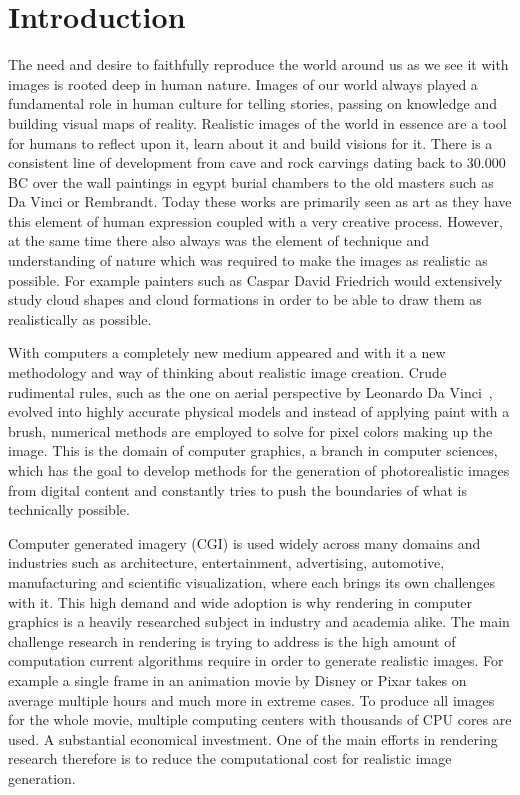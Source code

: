 \chapter{Introduction}
\label{sec:introduction}



The need and desire to faithfully reproduce the world around us as we see it with images is rooted deep in human nature. Images of our world always played a fundamental role in human culture for telling stories, passing on knowledge and building visual maps of reality. Realistic images of the world in essence are a tool for humans to reflect upon it, learn about it and build visions for it. There is a consistent line of development from cave and rock carvings dating back to 30.000 BC over the wall paintings in egypt burial chambers to the old masters such as Da Vinci or Rembrandt. Today these works are primarily seen as art as they have this element of human expression coupled with a very creative process. However, at the same time there also always was the element of technique and understanding of nature which was required to make the images as realistic as possible. For example painters such as Caspar David Friedrich would extensively study cloud shapes and cloud formations in order to be able to draw them as realistically as possible.

With computers a completely new medium appeared and with it a new methodology and way of thinking about realistic image creation. Crude rudimental rules, such as the one on aerial perspective by Leonardo Da Vinci~\cite{DaVinci1651}, evolved into highly accurate physical models and instead of applying paint with a brush, numerical methods are employed to solve for pixel colors making up the image. This is the domain of computer graphics, a branch in computer sciences, which has the goal to develop methods for the generation of photorealistic images from digital content and constantly tries to push the boundaries of what is technically possible.

Computer generated imagery (CGI) is used widely across many domains and industries such as architecture, entertainment, advertising, automotive, manufacturing and scientific visualization, where each brings its own challenges with it. This high demand and wide adoption is why rendering in computer graphics is a heavily researched subject in industry and academia alike. The main challenge research in rendering is trying to address is the high amount of computation current algorithms require in order to generate realistic images. For example a single frame in an animation movie by Disney or Pixar takes on average multiple hours and much more in extreme cases. To produce all images for the whole movie, multiple computing centers with thousands of CPU cores are used. A substantial economical investment. One of the main efforts in rendering research therefore is to reduce the computational cost for realistic image generation.

